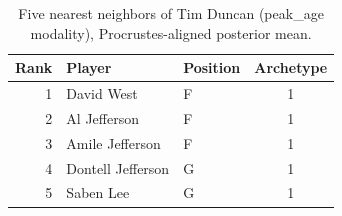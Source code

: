 \begin{table}[htbp]
  \centering\small
  \begin{tabular}{rllc}
    \toprule
    Rank & Player & Position & Archetype \\
    \midrule
    1 & David West & F & 1 \\
    2 & Al Jefferson & F & 1 \\
    3 & Amile Jefferson & F & 1 \\
    4 & Dontell Jefferson & G & 1 \\
    5 & Saben Lee & G & 1 \\
    \bottomrule
  \end{tabular}
  \caption{Five nearest neighbors of Tim Duncan (peak_age modality), Procrustes-aligned posterior mean.}
  \label{tab:Tim_Duncan_neighbors_peak_age}
\end{table}

